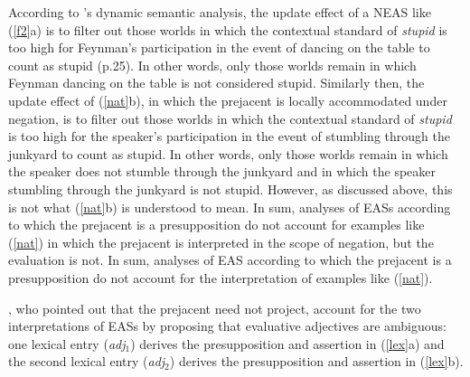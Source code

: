 \documentclass[11pt,fleqn]{article}
\newcommand{\6}{\mbox{$[\hspace*{-.6mm}[$}}
\newcommand{\9}{\mbox{$]\hspace*{-.6mm}]$}}
\newcommand{\citepos}[1]{\citeauthor{#1}'s \citeyear{#1}}
\begin{document}
According to \citepos{barker02} dynamic semantic analysis, the update effect of a NEAS like (\ref{f2}a) is to filter out those worlds in which the contextual standard of {\em stupid} is too high for Feynman's participation in the event of dancing on the table to count as stupid (p.25). In other words, only those worlds remain in which Feynman dancing on the table is not considered stupid. Similarly then, the update effect of (\ref{nat}b), in which the prejacent is locally accommodated under negation, is to filter out those worlds in which the contextual standard of {\em stupid} is too high for the speaker's participation in the event of stumbling through the junkyard to count as stupid. In other words, only those worlds remain in which the speaker does not stumble through the junkyard and in which the speaker stumbling through the junkyard is not stupid. However, as discussed above, this is not what (\ref{nat}b) is understood to mean. In sum, analyses of EASs according to which the prejacent is a presupposition do not account for examples like (\ref{nat}) in which the prejacent is interpreted in the scope of negation, but the evaluation is not. In sum, analyses of EAS according to which the prejacent is a presupposition do not account for the interpretation of examples like (\ref{nat}).

\citet{karttunen-etal2014}, who pointed out that the prejacent need not project, account for the two interpretations of EASs by proposing that evaluative adjectives are ambiguous: one lexical entry ({\em adj}$_1$) derives the presupposition and assertion in (\ref{lex}a) and the second lexical entry ({\em adj}$_2$) derives the presupposition and assertion in (\ref{lex}b).
\end{document}
